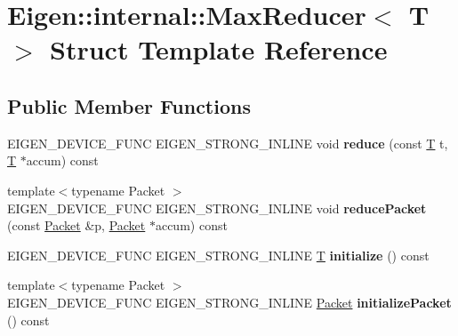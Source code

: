 \hypertarget{struct_eigen_1_1internal_1_1_max_reducer}{}\section{Eigen\+:\+:internal\+:\+:Max\+Reducer$<$ T $>$ Struct Template Reference}
\label{struct_eigen_1_1internal_1_1_max_reducer}
\subsection*{Public Member Functions}
\begin{DoxyCompactItemize}
\item 
\mbox{\label{struct_eigen_1_1internal_1_1_max_reducer_aa10b70dc4bfea534391bfd76c55beade}} 
E\+I\+G\+E\+N\+\_\+\+D\+E\+V\+I\+C\+E\+\_\+\+F\+U\+NC E\+I\+G\+E\+N\+\_\+\+S\+T\+R\+O\+N\+G\+\_\+\+I\+N\+L\+I\+NE void {\bfseries reduce} (const \hyperlink{group___sparse_core___module}{T} t, \hyperlink{group___sparse_core___module}{T} $\ast$accum) const
\item 
\mbox{\label{struct_eigen_1_1internal_1_1_max_reducer_a3dfd1dfe7bb8040603b0c0022498bfa6}} 
{\footnotesize template$<$typename Packet $>$ }\\E\+I\+G\+E\+N\+\_\+\+D\+E\+V\+I\+C\+E\+\_\+\+F\+U\+NC E\+I\+G\+E\+N\+\_\+\+S\+T\+R\+O\+N\+G\+\_\+\+I\+N\+L\+I\+NE void {\bfseries reduce\+Packet} (const \hyperlink{union_eigen_1_1internal_1_1_packet}{Packet} \&p, \hyperlink{union_eigen_1_1internal_1_1_packet}{Packet} $\ast$accum) const
\item 
\mbox{\label{struct_eigen_1_1internal_1_1_max_reducer_a4e113c9d04f0057bdfe79f067b8590bc}} 
E\+I\+G\+E\+N\+\_\+\+D\+E\+V\+I\+C\+E\+\_\+\+F\+U\+NC E\+I\+G\+E\+N\+\_\+\+S\+T\+R\+O\+N\+G\+\_\+\+I\+N\+L\+I\+NE \hyperlink{group___sparse_core___module}{T} {\bfseries initialize} () const
\item 
\mbox{\label{struct_eigen_1_1internal_1_1_max_reducer_a372234d5a5c2a5fd8a6aecde3db10d74}} 
{\footnotesize template$<$typename Packet $>$ }\\E\+I\+G\+E\+N\+\_\+\+D\+E\+V\+I\+C\+E\+\_\+\+F\+U\+NC E\+I\+G\+E\+N\+\_\+\+S\+T\+R\+O\+N\+G\+\_\+\+I\+N\+L\+I\+NE \hyperlink{union_eigen_1_1internal_1_1_packet}{Packet} {\bfseries initialize\+Packet} () const

\end{DoxyCompactItemize}
